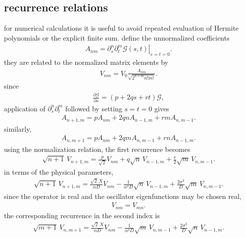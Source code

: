 \subsection{recurrence relations}
for numerical calculations it is useful to avoid repeated evaluation of
Hermite polynomials or the explicit finite sum. define the unnormalized
coefficients
\begin{align}
    A_{nm}
    =
    \left.
    \partial_s^n\partial_t^m\mathcal G(s,t)
    \right|_{s=t=0}.
\end{align}
they are related to the normalized matrix elements by
\begin{align}
    V_{nm}
    =
    V_0 \frac{A_{nm}}{\sqrt{2^{n+m}n!m!}}.
\end{align}
since
\begin{align}
    \frac{\partial\mathcal G}{\partial s}
    =
    (p+2qs+rt)\mathcal G,
\end{align}
application of $\partial_s^n\partial_t^m$ followed by setting $s=t=0$
gives
\begin{align}
    \boxed{
        A_{n+1,m}
        =
        pA_{nm}
        +
        2qnA_{n-1,m}
        +
        rmA_{n,m-1}.
    }
\end{align}
similarly,
\begin{align}
    \boxed{
        A_{n,m+1}
        =
        pA_{nm}
        +
        2qmA_{n,m-1}
        +
        rnA_{n-1,m}.
    }
\end{align}
using the normalization relation, the first recurrence becomes
\begin{align}
    \boxed{
        \sqrt{n+1}\,V_{n+1,m}
        =
        \frac{p}{\sqrt{2}}V_{nm}
        +
        q\sqrt{n}\,V_{n-1,m}
        +
        \frac{r}{2}\sqrt{m}\,V_{n,m-1}.
    }
\end{align}
in terms of the physical parameters,
\begin{align}
    \boxed{
        \sqrt{n+1}\,V_{n+1,m}
        =
        \frac{\sqrt{2}\,X}{\alpha D}V_{nm}
        -
        \frac{1}{\alpha^2 D}\sqrt{n}\,V_{n-1,m}
        +
        \frac{2\sigma^2}{D}\sqrt{m}\,V_{n,m-1}.
    }
\end{align}
since the operator is real and the oscillator eigenfunctions may be chosen
real,
\begin{align}
    \boxed{
        V_{nm}=V_{mn}.
    }
\end{align}
the corresponding recurrence in the second index is
\begin{align}
    \boxed{
        \sqrt{m+1}\,V_{n,m+1}
        =
        \frac{\sqrt{2}\,X}{\alpha D}V_{nm}
        -
        \frac{1}{\alpha^2 D}\sqrt{m}\,V_{n,m-1}
        +
        \frac{2\sigma^2}{D}\sqrt{n}\,V_{n-1,m}.
    }
\end{align}

